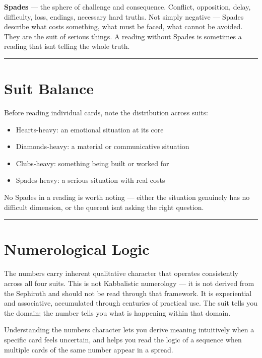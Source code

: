 \textbf{Spades} --- the sphere of challenge and consequence. Conflict, opposition, delay, difficulty, loss, endings, necessary hard truths. Not simply negative --- Spades describe what costs something, what must be faced, what cannot be avoided. They are the suit of serious things. A reading without Spades is sometimes a reading that isn\textquotesingle t telling the whole truth.

\begin{center}\rule{0.5\linewidth}{0.5pt}\end{center}

\section{Suit Balance}\label{suit-balance}

Before reading individual cards, note the distribution across suits:

\begin{itemize}
\tightlist
\item
  Hearts-heavy: an emotional situation at its core
\item
  Diamonds-heavy: a material or communicative situation
\item
  Clubs-heavy: something being built or worked for
\item
  Spades-heavy: a serious situation with real costs
\end{itemize}

No Spades in a reading is worth noting --- either the situation genuinely has no difficult dimension, or the querent isn\textquotesingle t asking the right question.

\begin{center}\rule{0.5\linewidth}{0.5pt}\end{center}

\section{Numerological Logic}\label{numerological-logic}

The numbers carry inherent qualitative character that operates consistently across all four suits. This is not Kabbalistic numerology --- it is not derived from the Sephiroth and should not be read through that framework. It is experiential and associative, accumulated through centuries of practical use. The suit tells you the domain; the number tells you what is happening within that domain.

Understanding the number\textquotesingle s character lets you derive meaning intuitively when a specific card feels uncertain, and helps you read the logic of a sequence when multiple cards of the same number appear in a spread.

